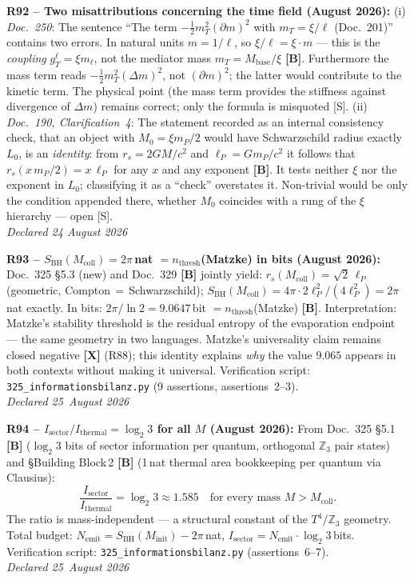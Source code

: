 \medskip
\textbf{R92 -- Two misattributions concerning the time field (August 2026):}
(i) \emph{Doc.~250}: The sentence \enquote{The term $-\tfrac12 m_T^2(\partial m)^2$ with $m_T = \xi/\ell$ (Doc.~201)} contains two errors.
In natural units $m = 1/\ell$, so $\xi/\ell = \xi\cdot m$ --- this is the \emph{coupling} $g_T^\ell = \xi m_\ell$, not the mediator mass $m_T = M_\mathrm{base}/\xi$ \textbf{[B]}.
Furthermore the mass term reads $-\tfrac12 m_T^2(\Delta m)^2$, not $(\partial m)^2$; the latter would contribute to the kinetic term.
The physical point (the mass term provides the stiffness against divergence of $\Delta m$) remains correct; only the formula is misquoted [S].
(ii) \emph{Doc.~190, Clarification~4}: The statement recorded as an internal consistency check, that an object with $M_0 = \xi m_P/2$ would have Schwarzschild radius exactly $L_0$, is an \emph{identity}: from $r_s = 2GM/c^2$ and $\ell_P = G m_P/c^2$ it follows that $r_s(x\,m_P/2) = x\,\ell_P$ for any $x$ and any exponent \textbf{[B]}.
It tests neither $\xi$ nor the exponent in $L_0$; classifying it as a \enquote{check} overstates it. Non-trivial would be only the condition appended there, whether $M_0$ coincides with a rung of the $\xi$ hierarchy --- open [S].\\
\emph{Declared 24 August 2026}

\medskip

\textbf{R93 -- $S_\mathrm{BH}(M_\mathrm{coll}) = 2\pi$\,nat $= n_\mathrm{thresh}$(Matzke) in bits (August 2026):}
Doc.~325 §5.3 (new) and Doc.~329 \textbf{[B]} jointly yield:
$r_s(M_\mathrm{coll}) = \sqrt{2}\,\ell_P$ (geometric, Compton\,$=$\,Schwarzschild);
$S_\mathrm{BH}(M_\mathrm{coll}) = 4\pi\cdot 2\ell_P^2/(4\ell_P^2) = 2\pi$\,nat exactly.
In bits: $2\pi/\ln 2 = 9.0647$\,bit $= n_\mathrm{thresh}$(Matzke) \textbf{[B]}.
Interpretation: Matzke's stability threshold is the residual entropy of the
evaporation endpoint --- the same geometry in two languages.
Matzke's universality claim remains closed negative \textbf{[X]} (R88);
this identity explains \emph{why} the value $9.065$ appears in both contexts
without making it universal.
Verification script: \texttt{325\_informationsbilanz.py} (9 assertions, assertions~2--3).\\
\emph{Declared 25~August 2026}

\medskip

\textbf{R94 -- $I_\mathrm{sector}/I_\mathrm{thermal} = \log_2 3$ for all $M$ (August 2026):}
From Doc.~325 §5.1 \textbf{[B]} ($\log_2 3$ bits of sector information per quantum,
orthogonal $\mathbb{Z}_3$ pair states) and §Building Block\,2 \textbf{[B]}
(1\,nat thermal area bookkeeping per quantum via Clausius):
\begin{equation*}
  \frac{I_\mathrm{sector}}{I_\mathrm{thermal}} = \log_2 3 \approx 1.585
  \quad\text{for every mass $M > M_\mathrm{coll}$.}
\end{equation*}
The ratio is mass-independent --- a structural constant of the
$T^4/\mathbb{Z}_3$ geometry. Total budget:
$N_\mathrm{emit} = S_\mathrm{BH}(M_\mathrm{init}) - 2\pi$\,nat,
$I_\mathrm{sector} = N_\mathrm{emit}\cdot\log_2 3$\,bits.
Verification script: \texttt{325\_informationsbilanz.py} (assertions~6--7).\\
\emph{Declared 25~August 2026}

